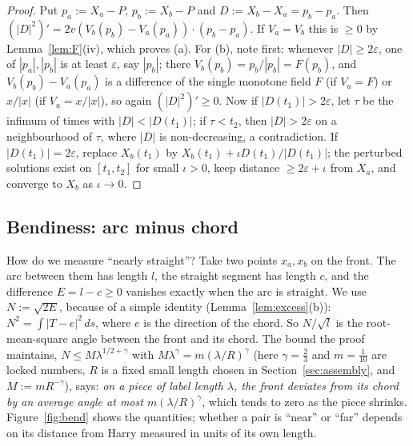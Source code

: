 \begin{proof}
Put $p_a:=X_a-P$, $p_b:=X_b-P$ and $D:=X_b-X_a=p_b-p_a$. Then $(|D|^2)'=2v(V_b(p_b)-V_a(p_a))\cdot(p_b-p_a)$. If
$V_a=V_b$ this is $\ge0$ by Lemma~\ref{lem:F}(iv), which proves (a). For (b), note first: whenever $|D|\ge2\varepsilon$,
one of $|p_a|,|p_b|$ is at least $\varepsilon$, say $|p_b|$; there $V_b(p_b)=p_b/|p_b|=F(p_b)$, and $V_b(p_b)-V_a(p_a)$
is a difference of the single monotone field $F$ (if $V_a=F$) or $x/|x|$ (if $V_a=x/|x|$), so again $(|D|^2)'\ge0$.
Now if $|D(t_1)|>2\varepsilon$, let $\tau$ be the infimum of times with $|D|<|D(t_1)|$; if $\tau<t_2$, then
$|D|>2\varepsilon$ on a neighbourhood of $\tau$, where $|D|$ is non-decreasing, a contradiction. If
$|D(t_1)|=2\varepsilon$, replace $X_b(t_1)$ by $X_b(t_1)+\iota D(t_1)/|D(t_1)|$; the perturbed solutions exist on
$[t_1,t_2]$ for small $\iota>0$, keep distance $\ge2\varepsilon+\iota$ from $X_a$, and converge to $X_b$ as $\iota\to0$.
\end{proof}

\subsection{Bendiness: arc minus chord}

How do we measure ``nearly straight''? Take two points $x_a,x_b$ on the front. The arc between them has length $l$, the
straight segment has length $c$, and the difference $E=l-c\ge0$ vanishes exactly when the arc is straight. We use
$N:=\sqrt{2E}$, because of a simple identity (Lemma~\ref{lem:excess}(b)): $N^2=\int|T-e|^2\,ds$, where $e$ is the
direction of the chord. So $N/\sqrt l$ is the root-mean-square angle between the front and its chord. The bound the proof
maintains, $N\le M\lambda^{1/2+\gamma}$ with $M\lambda^\gamma=m(\lambda/R)^\gamma$ (here $\gamma=\frac23$ and
$m=\frac1{10}$ are locked numbers, $R$ is a fixed small length chosen in Section~\ref{sec:assembly}, and
$M:=mR^{-\gamma}$), says: \emph{on a piece of label
length $\lambda$, the front deviates from its chord by an average angle at most $m(\lambda/R)^{\gamma}$}, which tends
to zero as the piece shrinks. Figure~\ref{fig:bend} shows the quantities; whether a pair is ``near'' or ``far'' depends
on its distance from Harry measured in units of its own length.

